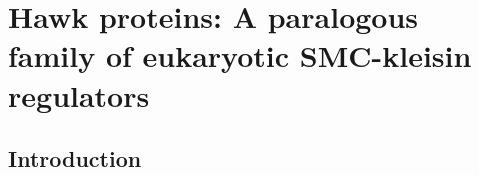 \documentclass[a4paper,11pt,twoside,openright]{scrbook}
\begin{document}
\chapter{Hawk proteins: A paralogous family of eukaryotic SMC-kleisin regulators}
\section{Introduction}
\lipsum
\lipsum
\lipsum
\end{document}
